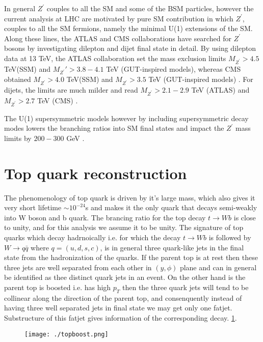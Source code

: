 \documentclass[12pt,a4paper]{article}		%
\begin{document}
\newpage  

	In general $Z^\prime$ couples to all the SM and some of the BSM particles, however the current analysis at LHC are motivated by pure SM contribution in which $Z^\prime$, couples to all the SM fermions, namely the minimal U(1) extensions of the SM. Along these lines, the ATLAS and CMS collaborations have searched for $Z^\prime$ bosons by investigating dilepton and dijet final state in detail. By using dilepton data at 13 TeV, the ATLAS collaboration \cite{atlas} set the mass exclusion limits $M_{Z^\prime}>4.5$ TeV(SSM) and $M_{Z^\prime}′>3.8-4.1 $ TeV (GUT-inspired models), whereas CMS obtained $M_{Z^\prime}>4.0 $ TeV(SSM) and $M_{Z^\prime}>3.5$ TeV (GUT-inspired models) \cite{cms}.  For dijets,  the limits are much milder and read $M_{Z^\prime} > 2.1-2.9$ TeV (ATLAS) \cite{atlasjet} and $M_{Z^\prime} >2.7$ TeV (CMS) \cite{cmsjet}.
	
	The U(1) supersymmetric models however by including supersymmetric decay modes lowers the branching ratios into SM final states and impact the $Z^\prime$ mass limits by $200-300$ GeV \cite{zsusy}. 

\newpage

\section{Top quark reconstruction}

The phenomenology of top quark is driven by it's large mass, which also gives it very short lifetime $\sim 10^{-24}$s and makes it the only quark that decays semi-weakly into W boson and b quark. The brancing ratio for the top decay $t \to W b $ is close to unity, and for this analysis we assume it to be unity. The signature of top quarks which decay hadrnoically i.e. for which the decay $t \to W b $ is followed by $W \to q \bar{q}$ where $q = (u, d, s, c)$, is in general three quark-like jets in the final state from the hadronization of the quarks. If the parent top is at rest then these three jets are well separated from each other in $(y,\phi)$ plane and can in general be identified as thee distinct quark jets in an event. On the other hand is the parent top is boosted i.e. has high $p_T$ then the three quark jets will tend to be collinear along the direction of the parent top, and consenquently instead of having three well separated jets in final state we may get only one  fatjet. Substructure of this fatjet gives information of the corresponding decay. \ref{boost}.     

 	\begin{figure}[h]
 		\begin{centering}	
 			\texttt{[image: ./topboost.png]} 
 			\caption{}
 			\label{boost}
 			\centering
 		\end{centering} 		
 	\end{figure}   
\end{document}
